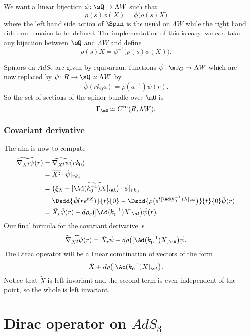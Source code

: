 We want a linear bijection $\phi\colon \sQ\to \Lambda W$ such that
\[ 
  \rho(s)\phi(X)=\phi\big( \rho(s)X \big)
\]
where the left hand side action of $\Spin$ is the usual on $\Lambda W$ while the right hand side one remains to be defined. The implementation of this is easy: we can take any bijection between $\sQ$ and $\Lambda W$ and define
\begin{equation}
  \rho(s)X=\phi^{-1}\big( \rho(s)\phi(X) \big).
\end{equation}

Spinors on $AdS_2$ are given by equivariant functions $\hat{\psi}\colon \mU_G\to \Lambda W$ which are now replaced by $\tilde{\psi}\colon R\to \sQ\simeq\Lambda W$ by
\[ 
  \hat{\psi}(rk_0a)=\rho(a^{-1})\tilde{\psi}(r).
\]
So the set of sections of the spinor bundle over $\mU$ is
\[ 
  \Gamma_{\mU}\simeq  C^{\infty}(R,\Lambda W).
\]

\subsubsection{Covariant derivative}

The aim is now to compute 
\[ 
\begin{split}
   \widetilde{\nabla_{X^{\sharp}}\psi}(r)&=\widehat{\nabla_{X^{\sharp}}\psi}(rk_0)\\
        &=\overline{ X^{\sharp} }\cdot \hat{\psi}|_{rk_0}\\
        &=\big( \xi_X-\widetilde{ [\Ad(k_0^{-1})X]_{\sA}  } \big)\cdot\hat{\psi}|_{rk_0}\\
        &=\Dsdd{ \tilde{\psi}(r e^{tX}) }{t}{0}-\Dsdd{ \rho\big(  e^{t[\Ad(k_0^{-1})X]_{\sA}} \big) }{t}{0}\tilde{\psi}(r)\\
        &=\tilde X_r\tilde{\psi}(r)-d\rho_e\big( [\Ad(k_0^{-1})X]_{\sA} \big)\tilde{\psi}(r).
\end{split}  
\]
Our final formula for the covariant derivative is
\begin{equation}
  \widetilde{\nabla_{X^{\sharp}}\psi}(r)=\tilde X_r\tilde{\psi}-d\rho\big( [\Ad(k_0^{-1})X]_{\sA} \big)\tilde{\psi}.
\end{equation}
The Dirac operator will be a linear combination of vectors of the form
\[ 
  \tilde X+d\rho\big( [\Ad(k_0^{-1})X]_{\sA}  \big).  
\]
Notice that $\tilde X$ is left invariant and the second term is even independent of the point, so the whole is left invariant.

\section{Dirac operator on \texorpdfstring{$AdS_{3}$}{AdS3}}  \label{PgDiracAdSTrois}

